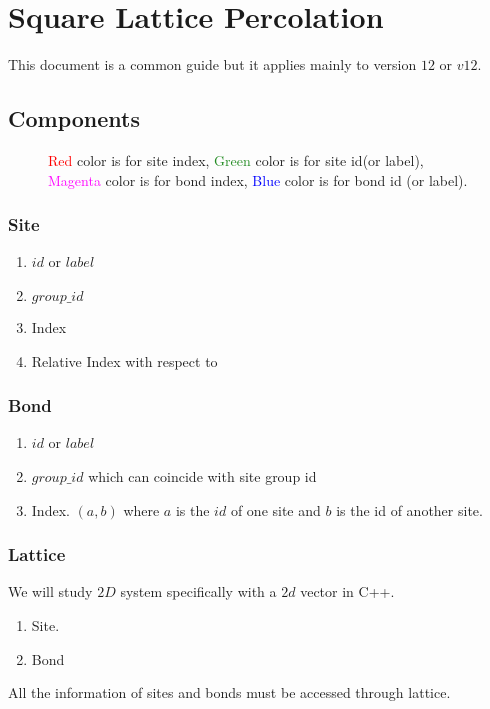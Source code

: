 %

	\chapter{Square Lattice Percolation}
	This document is a common guide but it applies mainly to version $12$ or $v12$.
	
	\section{Components}
	\begin{figure}
		\caption{\textcolor{red}{Red} color is for site index, \textcolor{ForestGreen}{Green} color is for site id(or label), \textcolor{magenta}{Magenta} color is for bond index, \textcolor{blue}{Blue} color is for bond id (or label).}
	\end{figure}
	\subsection{Site}
	\begin{enumerate}
		\item $id$ or $label$
		\item $group\_id$
		\item Index
		\item Relative Index with respect to 
	\end{enumerate}
	\subsection{Bond}
\begin{enumerate}
	\item $id$ or $label$
	\item $group\_id$ which can coincide with site group id
	
	\item Index. $(a,b)$ where $a$ is the $id$ of one site and $b$ is the id of another site.
\end{enumerate}
\newpage
	\subsection{Lattice}
	We will study $2D$ system specifically with a $2d$ vector in C++.
	\begin{enumerate}
		\item Site.
		\item Bond
	\end{enumerate}
 All the information of sites and bonds must be accessed through lattice.
	
